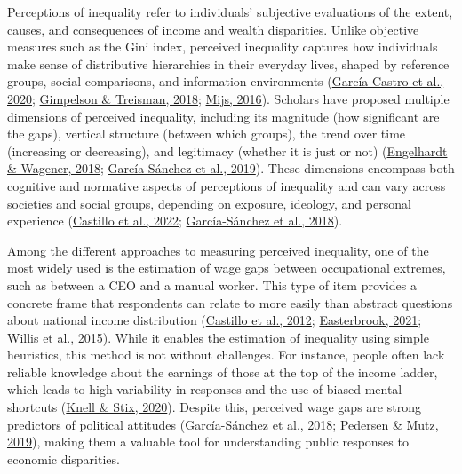 \documentclass[
  12pt,
]{article}
\begin{document}
Perceptions of inequality refer to individuals' subjective evaluations
of the extent, causes, and consequences of income and wealth
disparities. Unlike objective measures such as the Gini index, perceived
inequality captures how individuals make sense of distributive
hierarchies in their everyday lives, shaped by reference groups, social
comparisons, and information environments
(\protect\hyperlink{ref-garcia-castro_perceiving_2020}{García-Castro et
al., 2020};
\protect\hyperlink{ref-gimpelson_misperceiving_2018}{Gimpelson \&
Treisman, 2018}; \protect\hyperlink{ref-mijs_stratified_2016}{Mijs,
2016}). Scholars have proposed multiple dimensions of perceived
inequality, including its magnitude (how significant are the gaps),
vertical structure (between which groups), the trend over time
(increasing or decreasing), and legitimacy (whether it is just or not)
(\protect\hyperlink{ref-engelhardt_what_2018}{Engelhardt \& Wagener,
2018};
\protect\hyperlink{ref-garcia-sanchez_vicious_2019}{García-Sánchez et
al., 2019}). These dimensions encompass both cognitive and normative
aspects of perceptions of inequality and can vary across societies and
social groups, depending on exposure, ideology, and personal experience
(\protect\hyperlink{ref-castillo_perception_2022}{Castillo et al.,
2022};
\protect\hyperlink{ref-garcia-sanchez_perceptions_2018}{García-Sánchez
et al., 2018}).

Among the different approaches to measuring perceived inequality, one of
the most widely used is the estimation of wage gaps between occupational
extremes, such as between a CEO and a manual worker. This type of item
provides a concrete frame that respondents can relate to more easily
than abstract questions about national income distribution
(\protect\hyperlink{ref-castillo_percepcion_2019}{Castillo et al.,
2012}; \protect\hyperlink{ref-easterbrook_social_2021}{Easterbrook,
2021}; \protect\hyperlink{ref-willis_legitimacy_2015}{Willis et al.,
2015}). While it enables the estimation of inequality using simple
heuristics, this method is not without challenges. For instance, people
often lack reliable knowledge about the earnings of those at the top of
the income ladder, which leads to high variability in responses and the
use of biased mental shortcuts
(\protect\hyperlink{ref-knell_perceptions_2020}{Knell \& Stix, 2020}).
Despite this, perceived wage gaps are strong predictors of political
attitudes
(\protect\hyperlink{ref-garcia-sanchez_perceptions_2018}{García-Sánchez
et al., 2018}; \protect\hyperlink{ref-pedersen_attitudes_2019}{Pedersen
\& Mutz, 2019}), making them a valuable tool for understanding public
responses to economic disparities.
\end{document}
